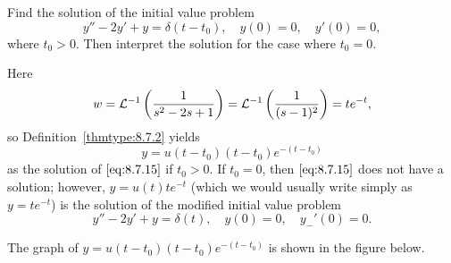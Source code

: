 \documentclass{ximera}
\begin{document}
\begin{example}\label{example:8.7.1}  Find the solution of the initial
value problem
\begin{equation} \label{eq:8.7.15}
y''-2y'+y=\delta(t-t_0), \quad  y(0)=0,\quad y'(0)=0,
\end{equation}
where $t_0>0$. Then interpret the solution for the case where $t_0=0$.
\begin{explanation}
Here
$$
w={\cal L}^{-1}\left(\frac{1}{s^2-2s+1}\right)={\cal L}^{-1}\left(
\frac{1}{(s-1)^2}\right)=te^{-t},
$$
so  Definition~\ref{thmtype:8.7.2} yields
$$
y=u(t-t_0)(t-t_0)e^{-(t-t_0)}
$$
as the solution of  $\eqref{eq:8.7.15}$ if $t_0>0$. If $t_0=0$,
then $\eqref{eq:8.7.15}$ does not have a solution; however,
$y=u(t)te^{-t}$
(which we would usually write simply as $y=te^{-t}$) is the solution
of the modified initial value problem
$$
y''-2y'+y=\delta(t), \quad  y(0)=0,\quad y_-'(0)=0.
$$

The graph of $y=u(t-t_0)(t-t_0)e^{-(t-t_0)}$ is shown in
the figure below.  %
\begin{center}
\end{center}

\end{explanation}
\end{example}




\end{document}
